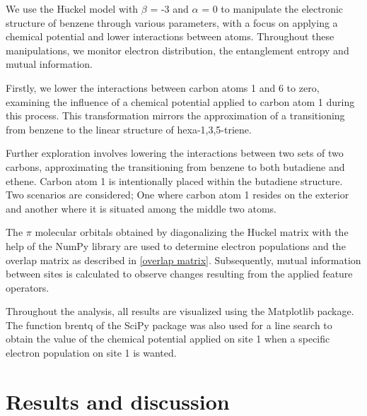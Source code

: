 \documentclass[twoside,twocolumn,9pt]{article}
\begin{document}
We use the H$\ddot{\text{u}}$ckel model with $\beta$ = -3 and $\alpha$ = 0 to manipulate the electronic structure of benzene through various parameters, with a focus on applying a chemical potential and lower interactions between atoms. Throughout these manipulations, we monitor electron distribution, the entanglement entropy and mutual information.

Firstly, we lower the interactions between carbon atoms 1 and 6 to zero, examining the influence of a chemical potential applied to carbon atom 1 during this process. This transformation mirrors the approximation of a transitioning from benzene to the linear structure of hexa-1,3,5-triene.

Further exploration involves lowering the interactions between two sets of two carbons, approximating the transitioning from benzene to both butadiene and ethene. Carbon atom 1 is intentionally placed within the butadiene structure. Two scenarios are considered; One where carbon atom 1 resides on the exterior and another where it is situated among the middle two atoms.

The $\pi$ molecular orbitals obtained by diagonalizing the H$\ddot{\text{u}}$ckel matrix with the help of the NumPy library\cite{NumPy} are used to determine electron populations and the overlap matrix as described in \cref{overlap matrix}. Subsequently, mutual information between sites is calculated to observe changes resulting from the applied feature operators.

Throughout the analysis, all results are visualized using the Matplotlib package\cite{Matplotlib}. The function brentq of the SciPy\cite{SciPy} package was also used for a line search to obtain the value of the chemical potential applied on site 1 when a specific electron population on site 1 is wanted.


\section{Results and discussion}

    
\end{document}
